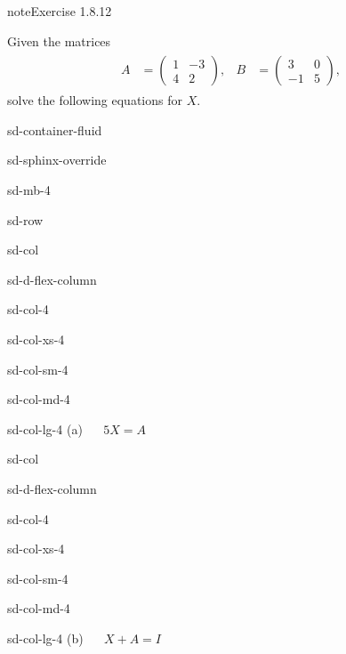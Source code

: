\documentclass[letterpaper,10pt,english]{jupyterBook}
\begin{document}
\begin{sphinxadmonition}{note}{Exercise 1.8.12}



\sphinxAtStartPar
Given the matrices
\begin{equation*}
\begin{split} \begin{align*}
    A &= \begin{pmatrix} 1 & -3 \\ 4 & 2 \end{pmatrix}, &
    B &= \begin{pmatrix} 3 & 0 \\ -1 & 5 \end{pmatrix},
\end{align*} \end{split}
\end{equation*}
\sphinxAtStartPar
solve the following equations for \(X\).

\begin{sphinxuseclass}{sd-container-fluid}
\begin{sphinxuseclass}{sd-sphinx-override}
\begin{sphinxuseclass}{sd-mb-4}
\begin{sphinxuseclass}{sd-row}
\begin{sphinxuseclass}{sd-col}
\begin{sphinxuseclass}{sd-d-flex-column}
\begin{sphinxuseclass}{sd-col-4}
\begin{sphinxuseclass}{sd-col-xs-4}
\begin{sphinxuseclass}{sd-col-sm-4}
\begin{sphinxuseclass}{sd-col-md-4}
\begin{sphinxuseclass}{sd-col-lg-4}
\sphinxAtStartPar
(a)   \(5X = A\)

\end{sphinxuseclass}
\end{sphinxuseclass}
\end{sphinxuseclass}
\end{sphinxuseclass}
\end{sphinxuseclass}
\end{sphinxuseclass}
\end{sphinxuseclass}
\begin{sphinxuseclass}{sd-col}
\begin{sphinxuseclass}{sd-d-flex-column}
\begin{sphinxuseclass}{sd-col-4}
\begin{sphinxuseclass}{sd-col-xs-4}
\begin{sphinxuseclass}{sd-col-sm-4}
\begin{sphinxuseclass}{sd-col-md-4}
\begin{sphinxuseclass}{sd-col-lg-4}
\sphinxAtStartPar
(b)   \(X + A = I\)


\end{sphinxuseclass}
\end{sphinxuseclass}
\end{sphinxuseclass}
\end{sphinxuseclass}
\end{sphinxuseclass}
\end{sphinxuseclass}
\end{sphinxuseclass}
\end{sphinxuseclass}
\end{sphinxuseclass}
\end{sphinxuseclass}
\end{sphinxuseclass}
\end{sphinxadmonition}
\end{document}

